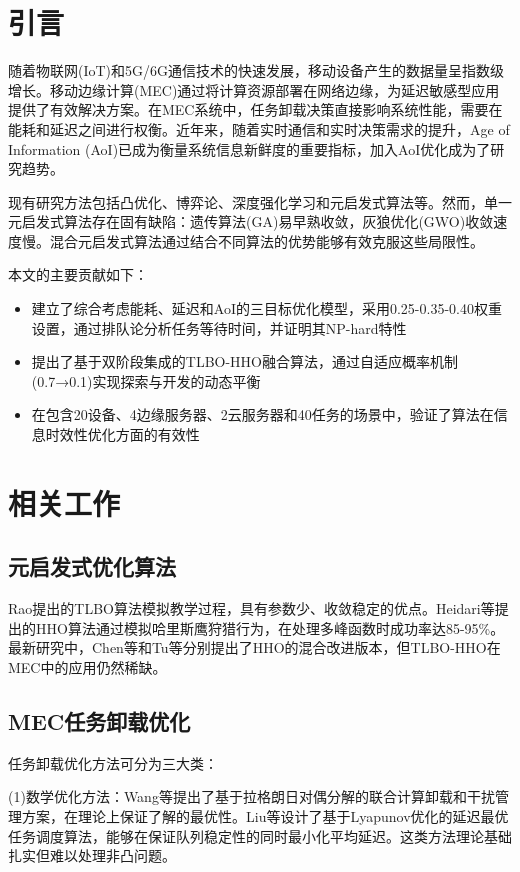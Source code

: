 \documentclass[conference]{IEEEtran}
\begin{document}
\section{引言}
随着物联网(IoT)和5G/6G通信技术的快速发展，移动设备产生的数据量呈指数级增长。移动边缘计算(MEC)通过将计算资源部署在网络边缘，为延迟敏感型应用提供了有效解决方案\cite{b1}。在MEC系统中，任务卸载决策直接影响系统性能，需要在能耗和延迟之间进行权衡。近年来，随着实时通信和实时决策需求的提升，Age of Information (AoI)已成为衡量系统信息新鲜度的重要指标\cite{b15}，加入AoI优化成为了研究趋势。

现有研究方法包括凸优化\cite{b2}、博弈论、深度强化学习\cite{b3}和元启发式算法等。然而，单一元启发式算法存在固有缺陷：遗传算法(GA)易早熟收敛，灰狼优化(GWO)收敛速度慢\cite{b4}。混合元启发式算法通过结合不同算法的优势能够有效克服这些局限性。

本文的主要贡献如下：
\begin{itemize}
    \item 建立了综合考虑能耗、延迟和AoI的三目标优化模型，采用0.25-0.35-0.40权重设置，通过排队论分析任务等待时间，并证明其NP-hard特性
    \item 提出了基于双阶段集成的TLBO-HHO融合算法，通过自适应概率机制(0.7→0.1)实现探索与开发的动态平衡
    \item 在包含20设备、4边缘服务器、2云服务器和40任务的场景中，验证了算法在信息时效性优化方面的有效性
\end{itemize}

\section{相关工作}
\subsection{元启发式优化算法}
Rao\cite{b5}提出的TLBO算法模拟教学过程，具有参数少、收敛稳定的优点。Heidari等\cite{b6}提出的HHO算法通过模拟哈里斯鹰狩猎行为，在处理多峰函数时成功率达85-95\%。最新研究中，Chen等\cite{b7}和Tu等\cite{b8}分别提出了HHO的混合改进版本，但TLBO-HHO在MEC中的应用仍然稀缺。


\subsection{MEC任务卸载优化}
任务卸载优化方法可分为三大类：

(1)数学优化方法：Wang等\cite{b9}提出了基于拉格朗日对偶分解的联合计算卸载和干扰管理方案，在理论上保证了解的最优性。Liu等\cite{b10}设计了基于Lyapunov优化的延迟最优任务调度算法，能够在保证队列稳定性的同时最小化平均延迟。这类方法理论基础扎实但难以处理非凸问题。
\end{document}
